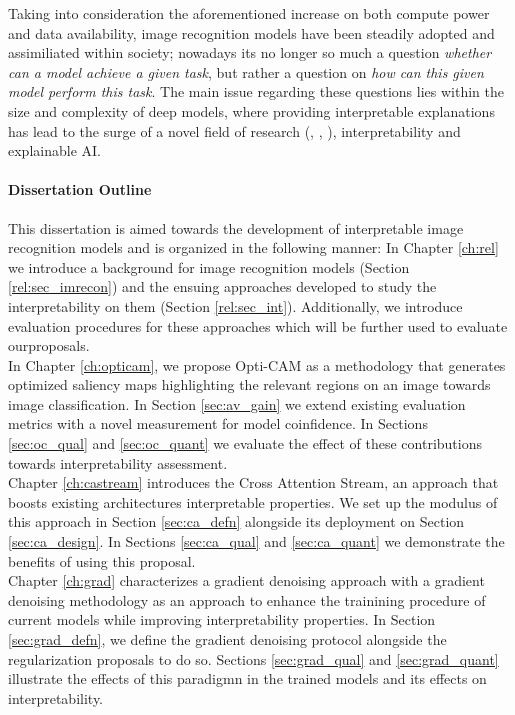 \noindent Taking into consideration the aforementioned  increase on  both compute power and data 
availability, image recognition models have been steadily adopted and assimiliated within society; 
nowadays its no longer so much a question \textit{whether can a model achieve a given task}, but 
rather a question on \textit{how can this given model perform this task}. The main issue regarding 
these questions lies within the size and complexity of deep models, where providing interpretable 
explanations has lead to the surge of a novel field of research (\cite{li2018deep}, 
\cite{guidotti2018survey}, \cite{bodria2021benchmarking}), interpretability and explainable AI.

\paragraph{Dissertation Outline}
\noindent This dissertation is aimed towards the development of interpretable image recognition 
models and is organized in the following manner: In Chapter \ref{ch:rel} we 
introduce a background for image recognition models (Section \ref{rel:sec_imrecon}) and the ensuing 
approaches developed to study the interpretability on them (Section \ref{rel:sec_int}). 
Additionally, we introduce evaluation procedures for these approaches which will be further used to 
evaluate ourproposals.\\

\noindent In Chapter \ref{ch:opticam}, we propose Opti-CAM as a methodology that generates 
optimized saliency maps highlighting the relevant regions on an image towards image classification. 
In Section \ref{sec:av_gain} we extend existing evaluation metrics with a novel measurement for 
model coinfidence. 
In Sections \ref{sec:oc_qual} and \ref{sec:oc_quant} we evaluate the effect of these contributions 
towards interpretability assessment.\\

\noindent Chapter \ref{ch:castream} introduces the Cross Attention Stream, an approach that boosts existing 
architectures interpretable properties. We set up the modulus of this approach in 
Section \ref{sec:ca_defn} alongside its deployment on Section \ref{sec:ca_design}. 
In Sections \ref{sec:ca_qual} and \ref{sec:ca_quant} we demonstrate the benefits of using this
proposal.\\

\noindent Chapter \ref{ch:grad} characterizes a gradient denoising approach with a gradient denoising 
methodology as an approach to enhance the trainining procedure of current models while improving 
interpretability properties. In Section \ref{sec:grad_defn}, we define the gradient denoising 
protocol alongside the regularization proposals to do so.
Sections \ref{sec:grad_qual} and \ref{sec:grad_quant} illustrate the effects of this paradigmn
in the trained models and its effects on interpretability.\\

